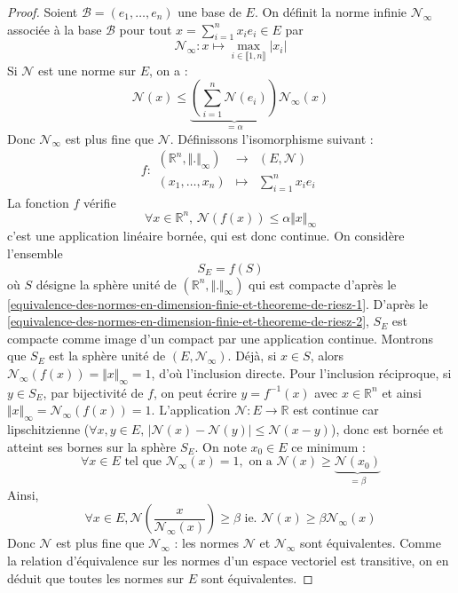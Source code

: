   \begin{proof}
    Soient $\mathcal{B} = (e_1, \dots, e_n)$ une base de $E$. On définit la norme infinie $\mathcal{N}_\infty$ associée à la base $\mathcal{B}$ pour tout $x = \sum_{i=1}^n x_i e_i \in E$ par
    \[ \mathcal{N}_\infty : x \mapsto \max_{i \in \llbracket 1, n \rrbracket} \vert x_i \vert \]
    Si $\mathcal{N}$ est une norme sur $E$, on a :
    \[ \mathcal{N}(x) \leq \underbrace{\left( \sum_{i=1}^n \mathcal{N}(e_i) \right)}_{= \alpha} \mathcal{N}_\infty(x) \]
    Donc $\mathcal{N}_\infty$ est plus fine que $\mathcal{N}$.
    \newpar
    Définissons l'isomorphisme suivant :
    \[
      f :
      \begin{array}{ccc}
        (\mathbb{R}^n, \Vert . \Vert_\infty) &\rightarrow& (E, \mathcal{N}) \\
        (x_1, \dots, x_n) &\mapsto& \sum_{i=1}^n x_i e_i
      \end{array}
    \]
    La fonction $f$ vérifie
    \[ \forall x \in \mathbb{R}^n, \, \mathcal{N}(f(x)) \leq \alpha \Vert x \Vert_\infty \]
    c'est une application linéaire bornée, qui est donc continue. On considère l'ensemble
    \[ S_E = f(S) \]
    où $S$ désigne la sphère unité de $(\mathbb{R}^n, \Vert. \Vert_\infty)$ qui est compacte d'après le \cref{equivalence-des-normes-en-dimension-finie-et-theoreme-de-riesz-1}. D'après le \cref{equivalence-des-normes-en-dimension-finie-et-theoreme-de-riesz-2}, $S_E$ est compacte comme image d'un compact par une application continue.
    \newpar
    Montrons que $S_E$ est la sphère unité de $(E, \mathcal{N}_\infty)$. Déjà, si $x \in S$, alors $\mathcal{N}_\infty(f(x)) = \Vert x \Vert_\infty = 1$, d'où l'inclusion directe. Pour l'inclusion réciproque, si $y \in S_E$, par bijectivité de $f$, on peut écrire $y = f^{-1}(x)$ avec $x \in \mathbb{R}^n$ et ainsi $\Vert x \Vert_\infty = \mathcal{N}_\infty(f(x)) = 1$.
    \newpar
    L'application $\mathcal{N} : E \rightarrow \mathbb{R}$ est continue car lipschitzienne ($\forall x, y \in E, \, \vert \mathcal{N}(x) - \mathcal{N}(y) \vert \leq \mathcal{N}(x - y)$), donc est bornée et atteint ses bornes sur la sphère $S_E$. On note $x_0 \in E$ ce minimum :
    \[ \forall x \in E \text{ tel que } \mathcal{N}_\infty(x) = 1, \text{ on a } \mathcal{N}(x) \geq \underbrace{\mathcal{N}(x_0)}_{= \beta} \]
    Ainsi,
    \[ \forall x \in E, \mathcal{N} \left(\frac{x}{\mathcal{N}_\infty(x)} \right) \geq \beta \text{ ie. } \mathcal{N}(x) \geq \beta \mathcal{N}_\infty(x) \]
    Donc $\mathcal{N}$ est plus fine que $\mathcal{N}_\infty$ : les normes $\mathcal{N}$ et $\mathcal{N}_\infty$ sont équivalentes. Comme la relation d'équivalence sur les normes d'un espace vectoriel est transitive, on en déduit que toutes les normes sur $E$ sont équivalentes.
  \end{proof}


